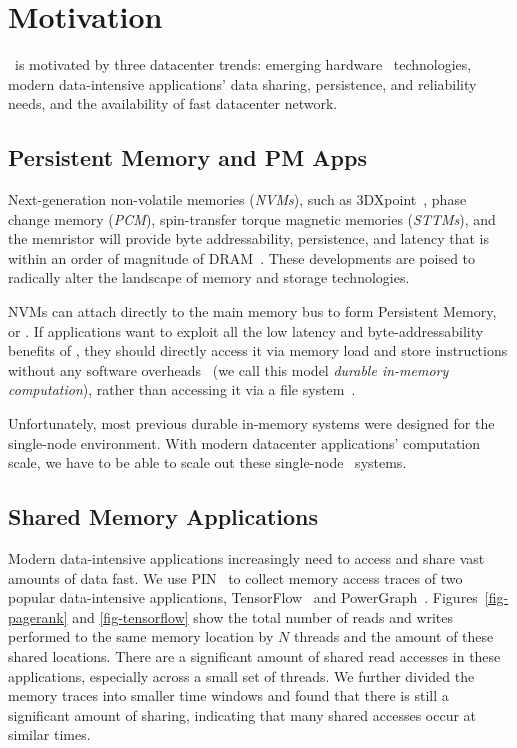 \section{Motivation}
\label{sec:motivation}

\dsnvm\ is motivated by three datacenter trends: 
emerging hardware \nvm\ technologies, 
modern data-intensive applications' data sharing, persistence, and reliability needs, 
and the availability of fast datacenter network.

\subsection{Persistent Memory and PM Apps}
Next-generation non-volatile memories ({\em NVMs}), 
such as 3DXpoint~\cite{Intel3DXpoint}, phase change memory ({\em PCM}),
spin-transfer torque magnetic memories ({\em STTMs}), and the memristor
will provide byte addressability, persistence, and latency that is within 
an order of magnitude of 
DRAM~\cite{hosomi2005novel,Lee10-pcmquest,lee2010phase,lee2011fast,qureshi2010morphable,NVMDB,yang2013memristive,Octopus}.
These developments are poised to radically alter the landscape of memory and storage technologies.

NVMs can attach directly to the main memory bus to form Persistent Memory, or \nvm. 
If applications want to exploit all the low latency and byte-addressability benefits of \nvm,
they should directly access it via memory load and store instructions without any software 
overheads~\cite{Coburn11-ASPLOS,Volos11-ASPLOS,Zhang15-Mojim,Memory-Persistency,Kamino-EuroSys17,pmxact-asplos16} 
(we call this model {\em durable in-memory computation}),
rather than accessing it via a file system~\cite{sosp09:bpfs,Dragojevic14-NSDI,Dulloor14-EuroSys,Xiaojian11-SC,HiNFS-Eurosys16,Octopus}.


Unfortunately, most previous durable in-memory systems were designed for the single-node environment.
With modern datacenter applications' computation scale, 
we have to be able to scale out these single-node \nvm\ systems.

\subsection{Shared Memory Applications}
Modern data-intensive applications increasingly need
to access and share vast amounts of data fast. 
We use PIN~\cite{Luk05-PLDI} to collect memory access traces of two popular data-intensive applications, 
TensorFlow~\cite{TensorFlow} and PowerGraph~\cite{Gonzalez12-OSDI}.
Figures~\ref{fig-pagerank} and \ref{fig-tensorflow} show the total number of reads and writes performed to the same memory location 
by $N$ threads and the amount of these shared locations.
There are a significant amount of shared read accesses in these applications,
especially across a small set of threads.
We further divided the memory traces into smaller time windows 
and found that there is still a significant amount of sharing, 
indicating that many shared accesses occur at similar times. 

